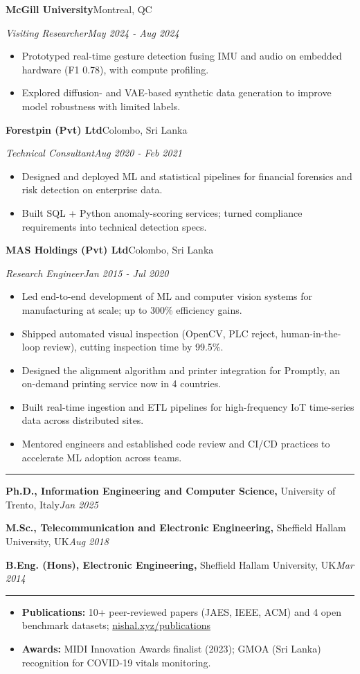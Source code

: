 \documentclass[10pt]{article}
\newcommand{\cvsection}[1]{\par\vspace{8pt}{\large\scshape\bfseries #1}\par\vspace{-3pt}\noindent\rule{\linewidth}{0.6pt}\par\vspace{2pt}}
\newenvironment{role}[4]{\par\noindent\textbf{#2}\hfill #3\par\noindent\textit{#1}\hfill\textit{#4}\par
  \begin{itemize}[leftmargin=1.2em,itemsep=0.5pt,parsep=0pt,topsep=1pt,partopsep=0pt,label=\textendash]}
  {\end{itemize}\par\vspace{4pt}}
\newcommand{\eduitem}[3]{\textbf{#1,} #2\hfill\textit{#3}\par}
\newenvironment{plainlist}{\begin{itemize}[leftmargin=1.2em,itemsep=0pt,parsep=0pt,topsep=0pt,partopsep=0pt,label=\textendash]}{\end{itemize}}
\begin{document}
\begin{role}{Visiting Researcher}{McGill University}{Montreal, QC}{May 2024 - Aug 2024}
  \item Prototyped real-time gesture detection fusing IMU and audio on embedded hardware (F1 0.78), with compute profiling.
  \item Explored diffusion- and VAE-based synthetic data generation to improve model robustness with limited labels.
\end{role}

\begin{role}{Technical Consultant}{Forestpin (Pvt) Ltd}{Colombo, Sri Lanka}{Aug 2020 - Feb 2021}
  \item Designed and deployed ML and statistical pipelines for financial forensics and risk detection on enterprise data.
  \item Built SQL + Python anomaly-scoring services; turned compliance requirements into technical detection specs.
\end{role}

\begin{role}{Research Engineer}{MAS Holdings (Pvt) Ltd}{Colombo, Sri Lanka}{Jan 2015 - Jul 2020}
  \item Led end-to-end development of ML and computer vision systems for manufacturing at scale; up to 300\% efficiency gains.
  \item Shipped automated visual inspection (OpenCV, PLC reject, human-in-the-loop review), cutting inspection time by 99.5\%.
  \item Designed the alignment algorithm and printer integration for Promptly, an on-demand printing service now in 4 countries.
  \item Built real-time ingestion and ETL pipelines for high-frequency IoT time-series data across distributed sites.
  \item Mentored engineers and established code review and CI/CD practices to accelerate ML adoption across teams.
\end{role}

\cvsection{Education}
\eduitem{Ph.D., Information Engineering and Computer Science}{University of Trento, Italy}{Jan 2025}
\eduitem{M.Sc., Telecommunication and Electronic Engineering}{Sheffield Hallam University, UK}{Aug 2018}
\eduitem{B.Eng. (Hons), Electronic Engineering}{Sheffield Hallam University, UK}{Mar 2014}

\cvsection{Publications \& Awards}
\begin{plainlist}
  \item \textbf{Publications:} 10+ peer-reviewed papers (JAES, IEEE, ACM) and 4 open benchmark datasets; \href{https://nishal.xyz/publications}{nishal.xyz/publications}
  \item \textbf{Awards:} MIDI Innovation Awards finalist (2023); GMOA (Sri Lanka) recognition for COVID-19 vitals monitoring.
\end{plainlist}
\end{document}
